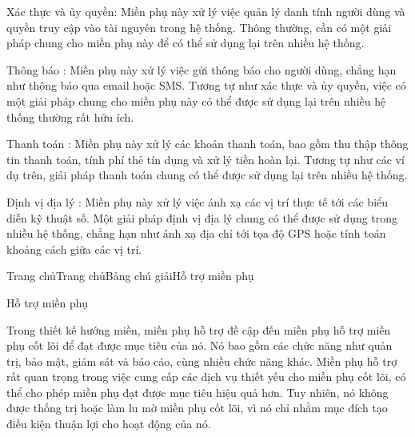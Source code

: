 Xác thực và ủy quyền: Miền phụ này xử lý việc quản lý danh tính người dùng và quyền truy cập vào tài nguyên trong hệ thống. Thông thường, cần có một giải pháp chung cho miền phụ này để có thể sử dụng lại trên nhiều hệ thống.

Thông báo : Miền phụ này xử lý việc gửi thông báo cho người dùng, chẳng hạn như thông báo qua email hoặc SMS. Tương tự như xác thực và ủy quyền, việc có một giải pháp chung cho miền phụ này có thể được sử dụng lại trên nhiều hệ thống thường rất hữu ích.

Thanh toán : Miền phụ này xử lý các khoản thanh toán, bao gồm thu thập thông tin thanh toán, tính phí thẻ tín dụng và xử lý tiền hoàn lại. Tương tự như các ví dụ trên, giải pháp thanh toán chung có thể được sử dụng lại trên nhiều hệ thống.

Định vị địa lý : Miền phụ này xử lý việc ánh xạ các vị trí thực tế tới các biểu diễn kỹ thuật số. Một giải pháp định vị địa lý chung có thể được sử dụng trong nhiều hệ thống, chẳng hạn như ánh xạ địa chỉ tới tọa độ GPS hoặc tính toán khoảng cách giữa các vị trí.






Trang chủTrang chủBảng chú giảiHỗ trợ miền phụ

Hỗ trợ miền phụ

Trong thiết kế hướng miền, miền phụ hỗ trợ đề cập đến miền phụ hỗ trợ miền phụ cốt lõi để đạt được mục tiêu của nó. Nó bao gồm các chức năng như quản trị, bảo mật, giám sát và báo cáo, cùng nhiều chức năng khác. Miền phụ hỗ trợ rất quan trọng trong việc cung cấp các dịch vụ thiết yếu cho miền phụ cốt lõi, có thể cho phép miền phụ đạt được mục tiêu hiệu quả hơn. Tuy nhiên, nó không được thống trị hoặc làm lu mờ miền phụ cốt lõi, vì nó chỉ nhằm mục đích tạo điều kiện thuận lợi cho hoạt động của nó.







